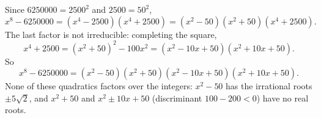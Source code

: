 Since $6250000=2500^2$ and $2500=50^2$,
\[x^8-6250000=\left(x^4-2500\right)\left(x^4+2500\right)=\left(x^2-50\right)\left(x^2+50\right)\left(x^4+2500\right).\]
The last factor is not irreducible: completing the square,
\[x^4+2500=\left(x^2+50\right)^2-100x^2=\left(x^2-10x+50\right)\left(x^2+10x+50\right).\]
So
\[x^8-6250000=\boxed{\left(x^2-50\right)\left(x^2+50\right)\left(x^2-10x+50\right)\left(x^2+10x+50\right)}.\]
None of these quadratics factors over the integers: $x^2-50$ has the irrational roots $\pm5\sqrt2$, and $x^2+50$ and $x^2\pm10x+50$ (discriminant $100-200<0$) have no real roots.
